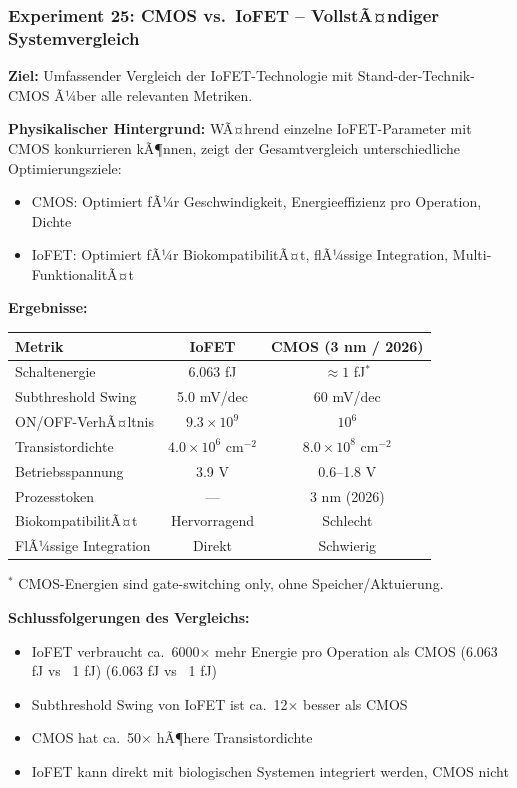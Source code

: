 ﻿\documentclass[a4paper,12pt]{scrreprt}
\theoremstyle{definition}
\begin{document}
\subsubsection{Experiment 25: CMOS vs.~IoFET -- VollstÃ¤ndiger Systemvergleich}

\textbf{Ziel:} Umfassender Vergleich der IoFET-Technologie mit Stand-der-Technik-CMOS Ã¼ber alle relevanten Metriken.

\textbf{Physikalischer Hintergrund:} WÃ¤hrend einzelne IoFET-Parameter mit CMOS konkurrieren kÃ¶nnen, zeigt der Gesamtvergleich unterschiedliche Optimierungsziele:
\begin{itemize}
	\item CMOS: Optimiert fÃ¼r Geschwindigkeit, Energieeffizienz pro Operation, Dichte
	\item IoFET: Optimiert fÃ¼r BiokompatibilitÃ¤t, flÃ¼ssige Integration, Multi-FunktionalitÃ¤t
\end{itemize}

\textbf{Ergebnisse:}
\begin{table}[H]
	\centering
	\begin{tabular}{lcc}
		\toprule
		\textbf{Metrik} & \textbf{IoFET} & \textbf{CMOS (3 nm / 2026)} \\
		\midrule
		Schaltenergie & 6.063 fJ & $\approx 1$ fJ$^{\ast}$ \\
		Subthreshold Swing & 5.0 mV/dec & 60 mV/dec \\
		ON/OFF-VerhÃ¤ltnis & $9.3 \times 10^9$ & $10^6$ \\
		Transistordichte & $4.0 \times 10^6$ cm$^{-2}$ & $8.0 \times 10^8$ cm$^{-2}$ \\
		Betriebsspannung & 3.9 V & 0.6--1.8 V \\
		Prozesstoken & --- & 3 nm (2026) \\
		BiokompatibilitÃ¤t & Hervorragend & Schlecht \\
		FlÃ¼ssige Integration & Direkt & Schwierig \\
		\bottomrule
	\end{tabular}
\end{table}
\noindent$^{\ast}$ CMOS-Energien sind gate-switching only, ohne Speicher/Aktuierung.

\textbf{Schlussfolgerungen des Vergleichs:}
\begin{itemize}
	\item IoFET verbraucht ca.~6000$\times$ mehr Energie pro Operation als CMOS (6.063 fJ vs ~1 fJ) (6.063 fJ vs ~1 fJ)
	\item Subthreshold Swing von IoFET ist ca.~12$\times$ besser als CMOS
	\item CMOS hat ca.~50$\times$ hÃ¶here Transistordichte
	\item IoFET kann direkt mit biologischen Systemen integriert werden, CMOS nicht
\end{itemize}
\end{document}
